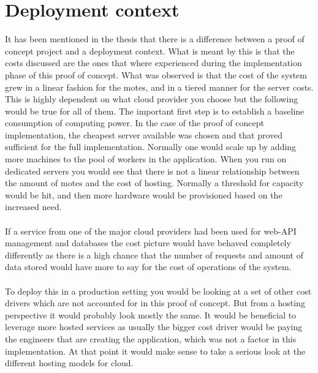 \documentclass[]{uiophd}
\begin{document}
\section{Deployment context}
It has been mentioned in the thesis that there is a difference between a proof of concept project and a deployment context. What is meant by this is that the costs discussed are the ones that where experienced during the implementation phase of this proof of concept. What was observed is that the cost of the system grew in a linear fashion for the motes, and in a tiered manner for the server costs. This is highly dependent on what cloud provider you choose but the following would be true for all of them. The important first step is to establish a baseline consumption of computing power. In the case of the proof of concept implementation, the cheapest server available was chosen and that proved sufficient for the full implementation. Normally one would scale up by adding more machines to the pool of workers in the application. When you run on dedicated servers you would see that there is not a linear relationship between the amount of motes and the cost of hosting. Normally a threshold for capacity would be hit, and then more hardware would be provisioned based on the increased need.
\\\\
If a service from one of the major cloud providers had been used for web-API management and databases the cost picture would have behaved completely differently as there is a high chance that the number of requests and amount of data stored would have more to say for the cost of operations of the system.
\\\\
To deploy this in a production setting you would be looking at a set of other cost drivers which are not accounted for in this proof of concept. But from a hosting perspective it would probably look mostly the same. It would be beneficial to leverage more hosted services as usually the bigger cost driver would be paying the engineers that are creating the application, which was not a factor in this implementation. At that point it would make sense to take a serious look at the different hosting models for cloud.
\\\\
\end{document}

